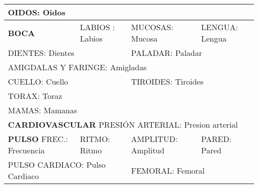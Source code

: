 \documentclass[10pt,a4paper]{article}
\begin{document}
{\begin{tabular}{|p{2.8cm}p{2.8cm}p{2.8cm}p{2.8cm}|}
\hline
\multicolumn{4}{|l|}{\begin{minipage}[t]{12.5 cm}\scriptsize{OIDOS: Oidos}\end{minipage}}\\
\hline
\scriptsize{\textbf{BOCA}}&\scriptsize{  LABIOS : Labios} &\scriptsize{MUCOSAS: Mucosa} & \scriptsize{LENGUA: Lengua} \\
\hline
\multicolumn{2}{|l}{\begin{minipage}[t]{5.5 cm}\scriptsize{DIENTES: Dientes}\end{minipage}}&\multicolumn{2}{l|}{\begin{minipage}[t]{5.5 cm}\scriptsize{PALADAR: Paladar}\end{minipage}}\\
\hline
\multicolumn{4}{|l|}{\begin{minipage}[t]{12.5 cm}\scriptsize{AMIGDALAS Y FARINGE: Amigladas}\end{minipage}}\\
\hline
\multicolumn{2}{|l}{\begin{minipage}[t]{5.5 cm}\scriptsize{CUELLO: Cuello}\end{minipage}}&\multicolumn{2}{l|}{\begin{minipage}[t]{5.5 cm}\scriptsize{TIROIDES: Tiroides}\end{minipage}}\\
\hline
\multicolumn{4}{|l|}{\begin{minipage}[t]{12.5 cm}\scriptsize{TORAX: Toraz}\end{minipage}}\\
\hline
\multicolumn{4}{|l|}{\begin{minipage}[t]{12.5 cm}\scriptsize{MAMAS: Mamanas}\end{minipage}}\\
\hline
\multicolumn{4}{|l|}{\begin{minipage}[t]{12.5 cm}\scriptsize{\textbf{CARDIOVASCULAR}  PRESI\'ON ARTERIAL: Presion arterial}\end{minipage}}\\
\hline
\scriptsize{\textbf{PULSO}  FREC.: Frecuencia} & \scriptsize{RITMO: Ritmo} & \scriptsize{AMPLITUD: Amplitud} & \scriptsize{PARED: Pared} \\
\hline
\multicolumn{2}{|l}{\begin{minipage}[t]{5.5 cm}\scriptsize{PULSO CARDIACO: Pulso Cardiaco}\end{minipage}}&\multicolumn{2}{l|}{\begin{minipage}[t]{5.5 cm}\scriptsize{FEMORAL: Femoral}\end{minipage}}\\

\end{tabular}}
\end{document}

